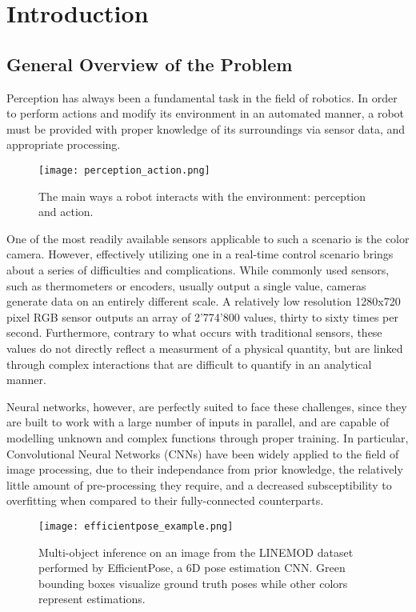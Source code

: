\chapter{Introduction}

\section{General Overview of the Problem}

Perception has always been a fundamental task in the field of robotics. In order to perform actions and modify its environment in an automated manner, a robot must be provided with proper knowledge of its surroundings via sensor data, and appropriate processing.

\begin{figure}[ht]
    \texttt{[image: perception\_action.png]}
    \caption{The main ways a robot interacts with the environment: perception and action.}
\end{figure}

One of the most readily available sensors applicable to such a scenario is the color camera. However, effectively utilizing one in a real-time control scenario brings about a series of difficulties and complications. While commonly used sensors, such as thermometers or encoders, usually output a single value, cameras generate data on an entirely different scale. A relatively low resolution 1280x720 pixel RGB sensor outputs an array of 2'774'800 values, thirty to sixty times per second. Furthermore, contrary to what occurs with traditional sensors, these values do not directly reflect a measurment of a physical quantity, but are linked through complex interactions that are difficult to quantify in an analytical manner.

Neural networks, however, are perfectly suited to face these challenges, since they are built to work with a large number of inputs in parallel, and are capable of modelling unknown and complex functions through proper training. In particular, Convolutional Neural Networks (CNNs) have been widely applied to the field of image processing, due to their independance from prior knowledge, the relatively little amount of pre-processing they require, and a decreased subsceptibility to overfitting when compared to their fully-connected counterparts.

\begin{figure}[ht]
    \texttt{[image: efficientpose\_example.png]}
    \caption{Multi-object inference on an image from the LINEMOD\cite{linemod} dataset performed by EfficientPose\cite{bukschat2020efficientpose}, a 6D pose estimation CNN. Green bounding boxes visualize ground truth poses while other colors represent estimations.} 
\end{figure}

